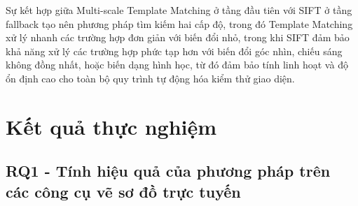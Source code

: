 \documentclass[a4paper, 12pt]{report}
\begin{document}
{%

Sự kết hợp giữa Multi-scale Template Matching ở tầng đầu tiên với SIFT ở tầng fallback tạo nên phương pháp tìm kiếm hai cấp độ, trong đó Template Matching xử lý nhanh các trường hợp đơn giản với biến đổi nhỏ, trong khi SIFT đảm bảo khả năng xử lý các trường hợp phức tạp hơn với biến đổi góc nhìn, chiếu sáng không đồng nhất, hoặc biến dạng hình học, từ đó đảm bảo tính linh hoạt và độ ổn định cao cho toàn bộ quy trình tự động hóa kiểm thử giao diện.



\section{Kết quả thực nghiệm}

\subsection[RQ1 - Tính hiệu quả của phương pháp trên các công cụ vẽ sơ đồ trực tuyến]{
RQ1 - Tính {} hiệu {} quả {} của {} phương {} pháp {} trên {} các {} công {} cụ {} vẽ {} sơ {} đồ {} trực {} tuyến}


}
\end{document}
